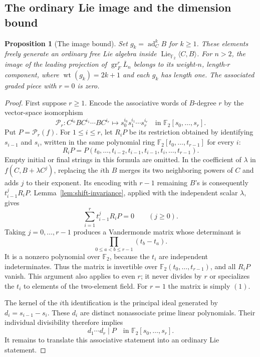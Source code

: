 \documentclass[11pt]{article}
\newcommand{\F}{{\mathbb F_2}}
\newcommand{\Lie}{\operatorname{Lie}}
\DeclareMathOperator{\ad}{ad}
\DeclareMathOperator{\wt}{wt}
\newtheorem{proposition}[theorem]{Proposition}
\theoremstyle{definition}
\theoremstyle{remark}
\numberwithin{equation}{section}
\begin{document}
\subsection{The ordinary Lie image and the dimension bound}
\begin{proposition}[The image bound]
\label{prop:image-bound}
Set $g_k=\ad_C^kB$ for $k\geq1$.
These elements freely generate an ordinary free Lie algebra inside
$\Lie_{\F}\langle C,B\rangle$.
For $n>2$, the image of the leading projection of
$\operatorname{gr}^r_F\overline L_n$ belongs to its weight-$n$,
length-$r$ component, where $\wt(g_k)=2k+1$ and each $g_k$ has
length one.
The associated graded piece with $r=0$ is zero.
\end{proposition}

\begin{proof}
First suppose $r\geq1$.
Encode the associative words of $B$-degree $r$ by the vector-space
isomorphism
\[
 \mathcal P_r:
 C^{i_0}BC^{i_1}\cdots BC^{i_r}
 \longmapsto s_0^{i_0}s_1^{i_1}\cdots s_r^{i_r}
 \quad\text{in }\F[s_0,\ldots,s_r].
\]
Put $P=\mathcal P_r(f)$.
For $1\leq i\leq r$, let $R_iP$ be its restriction obtained by
identifying $s_{i-1}$ and $s_i$, written in the same polynomial
ring $\F[t_0,\ldots,t_{r-1}]$ for every $i$:
\[
 R_iP=P(t_0,\ldots,t_{i-2},t_{i-1},t_{i-1},
               t_i,\ldots,t_{r-1}).
\]
Empty initial or final strings in this formula are omitted.
In the coefficient of $\lambda$ in $f(C,B+\lambda C^j)$, replacing
the $i$th $B$ merges its two neighboring powers of $C$ and adds
$j$ to their exponent.  Its encoding with $r-1$ remaining $B$'s
is consequently $t_{i-1}^{j}R_iP$.
Lemma~\ref{lem:shift-invariance}, applied with the independent
scalar $\lambda$, gives
\begin{equation}
 \label{eq:vandermonde-system}
 \sum_{i=1}^r t_{i-1}^{j}R_iP=0\qquad(j\geq0).
\end{equation}
Taking $j=0,\ldots,r-1$ produces a Vandermonde matrix whose
determinant is
\[
 \prod_{0\leq a<b\leq r-1}(t_b-t_a).
\]
It is a nonzero polynomial over $\F$, because the $t_i$ are
independent indeterminates.  Thus the matrix is invertible over
$\F(t_0,\ldots,t_{r-1})$, and all $R_iP$ vanish.
This argument also applies to even $r$; it never divides by $r$
or specializes the $t_i$ to elements of the two-element field.
For $r=1$ the matrix is simply $(1)$.

The kernel of the $i$th identification is the principal ideal
generated by $d_i=s_{i-1}-s_i$.
These $d_i$ are distinct nonassociate prime linear polynomials.
Their individual divisibility therefore implies
\begin{equation}
 \label{eq:consecutive-divisibility}
 d_1\cdots d_r\mid P
 \quad\text{in }\F[s_0,\ldots,s_r].
\end{equation}
It remains to translate this associative statement into an
ordinary Lie statement.


\end{proof}
\end{document}
